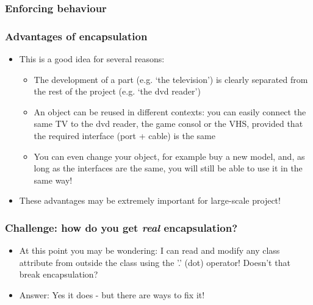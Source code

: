 \documentclass[9pt]{beamer}
\begin{document}
\begin{frame}
  \frametitle{Enforcing behaviour}
  
\end{frame}


\begin{frame}
  \frametitle{Advantages of encapsulation}
  
  \begin{itemize}
    \item This is a good idea for several reasons:
    
    \medskip
    
    \begin{itemize}
      \item The development of a part (e.g. `the television') is clearly separated
            from the rest of the project (e.g. `the dvd reader')
      \medskip
      \item An object can be reused in different contexts: you can easily connect
            the same TV to the dvd reader, the game consol or the VHS, 
            provided that the required interface (port + cable) is the same
      \medskip
      \item You can even change your object, for example buy a new model,
            and, as long as the interfaces are the same, you will still be able 
            to use it in the same way!
    \end{itemize}
    
    \medskip
  
    \item These advantages may be extremely important for large-scale project!

  \end{itemize}

\end{frame}


\begin{frame}
  \frametitle{Challenge: how do you get \emph{real} encapsulation?}
  \begin{itemize}
    \item At this point you may be wondering: I can read and modify any class attribute 
          from outside the class using the '.' (dot) operator! 
          Doesn't that break encapsulation?
          
    \bigskip
    
    \item Answer: Yes it does - but there are ways to fix it!
  \end{itemize}
\end{frame}
\end{document}
